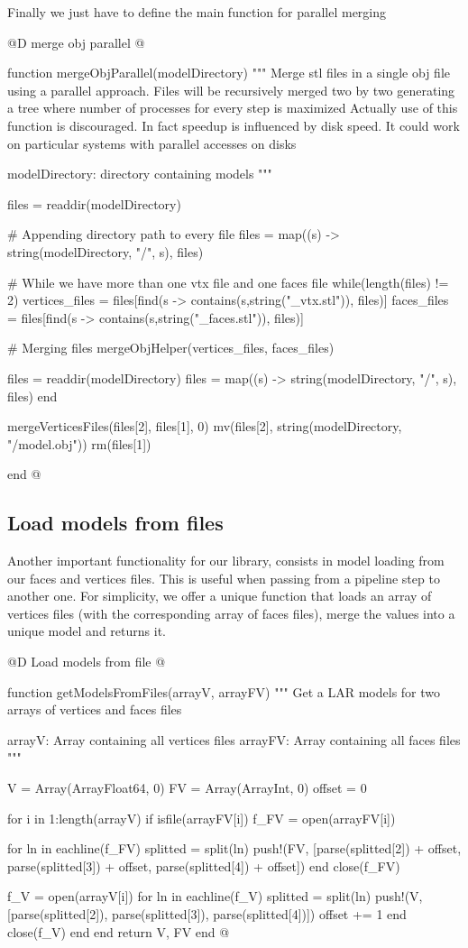 \documentclass[11pt,oneside]{article}	%
\begin{document}
Finally we just have to define the main function for parallel merging 

@D merge obj parallel
@{function mergeObjParallel(modelDirectory)
  """
  Merge stl files in a single obj file using a parallel
  approach. Files will be recursively merged two by two
  generating a tree where number of processes for every
  step is maximized
  Actually use of this function is discouraged. In fact
  speedup is influenced by disk speed. It could work on
  particular systems with parallel accesses on disks

  modelDirectory: directory containing models
  """

  files = readdir(modelDirectory)

  # Appending directory path to every file
  files = map((s) -> string(modelDirectory, "/", s), files)

  # While we have more than one vtx file and one faces file
  while(length(files) != 2)
    vertices_files = files[find(s -> contains(s,string("_vtx.stl")), files)]
    faces_files = files[find(s -> contains(s,string("_faces.stl")), files)]

    # Merging files
    mergeObjHelper(vertices_files, faces_files)

    files = readdir(modelDirectory)
    files = map((s) -> string(modelDirectory, "/", s), files)
  end

  mergeVerticesFiles(files[2], files[1], 0)
  mv(files[2], string(modelDirectory, "/model.obj"))
  rm(files[1])

end @}

\subsection{Load models from files}\label{sec:loadObj}

Another important functionality for our library, consists in model loading from our faces and vertices files. This is useful when passing from a pipeline step to another one. For simplicity, we offer a unique function that loads an array of vertices files (with the corresponding array of faces files), merge the values into a unique model and returns it.

@D Load models from file
@{function getModelsFromFiles(arrayV, arrayFV)
  """
  Get a LAR models for two arrays of vertices
  and faces files

  arrayV: Array containing all vertices files
  arrayFV: Array containing all faces files
  """

  V = Array(Array{Float64}, 0)
  FV = Array(Array{Int}, 0)
  offset = 0

  for i in 1:length(arrayV)
    if isfile(arrayFV[i])
      f_FV = open(arrayFV[i])

      for ln in eachline(f_FV)
        splitted = split(ln)
        push!(FV, [parse(splitted[2]) + offset, parse(splitted[3]) +
	     offset, parse(splitted[4]) + offset])
      end
      close(f_FV)

      f_V = open(arrayV[i])
      for ln in eachline(f_V)
        splitted = split(ln)
        push!(V, [parse(splitted[2]), parse(splitted[3]),
             parse(splitted[4])])
        offset += 1
      end
      close(f_V)
    end
  end
  return V, FV
end @}
\end{document}
